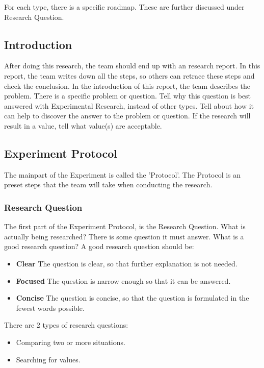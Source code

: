\documentclass[10pt]{report}
\begin{document}
\noindent For each type, there is a specific roadmap. These are further discussed under Research Question.

\subsection{Introduction}

After doing this research, the team should end up with an research report. In this report, the team writes down all the steps, so others can retrace these steps and check the conclusion. In the introduction of this report, the team describes the problem. There is a specific problem or question. Tell why this question is best answered with Experimental Research, instead of other types. Tell about how it can help to discover the answer to the problem or question. If the research will result in a value, tell what value(s) are acceptable.

\subsection{Experiment Protocol}

The mainpart of the Experiment is called the 'Protocol'. The Protocol is an preset steps that the team will take when conducting the research.

\subsubsection{Research Question}

The first part of the Experiment Protocol, is the Research Question. What is actually being researched? There is some question it must answer. What is a good research question? A good research question should be:

\begin{itemize}
	\item \textbf{Clear} The question is clear, so that further explanation is not needed.
	\item \textbf{Focused} The question is narrow enough so that it can be answered.
	\item \textbf{Concise} The question is concise, so that the question is formulated in the fewest words possible.
\end{itemize}

\noindent There are 2 types of research questions:

\begin{itemize}
	\item Comparing two or more situations.
	\item Searching for values.
\end{itemize}
\end{document}
